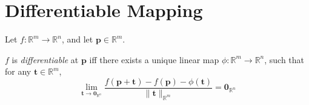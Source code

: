 


\section{Differentiable Mapping}


\begin{definition}
	\label{def: differentiable}
	Let $f: \mathbb R^m \to \mathbb R^n$, and let $\mathbf p \in \mathbb R^m$.
	

	$f$ is \textit{differentiable} at $\mathbf p$ iff there exists a unique linear map $\phi: \mathbb R^m \to \mathbb R^n$, such that for any $\mathbf t \in \mathbb R^m$,
	$$
	\lim_{\mathbf t \to \mathbf 0_{\mathbb R^n}} \frac{f(\mathbf p + \mathbf t) - f(\mathbf p) - \phi(\mathbf t)}{\| \mathbf t \|_{\mathbb R^m}} = \mathbf 0_{\mathbb R^n}
	$$
\end{definition}


